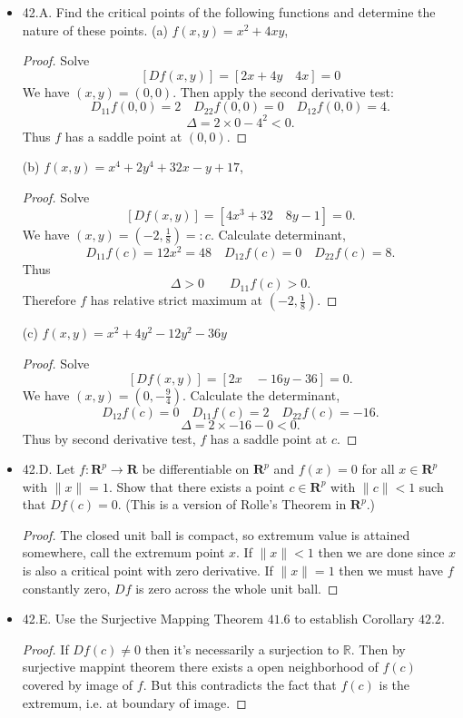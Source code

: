 \begin{itemize}
\item 42.A. Find the critical points of the following functions and determine the nature of these points.
(a) $f(x, y)=x^2+4 x y$,
\begin{proof}
	Solve
	 \[
		 [Df(x,y)] = [2x+4y \quad 4x] = 0
\]
We have $(x,y) = (0,0)$. Then apply the second derivative test:
\[
	D_{11}f(0,0) = 2 \quad D_{22}f(0,0) = 0 \quad D_{12} f(0,0) = 4
.\] 
\[
	\Delta = 2 \times 0 - 4^2 < 0
.\] 
Thus $f$ has a saddle point at $(0,0)$.
\end{proof}

(b) $f(x, y)=x^4+2 y^4+32 x-y+17$,
\begin{proof}
	Solve
	\[
		[Df(x,y)] = [4x^3 + 32 \quad 8y-1] = 0
	.\] 
	We have $(x,y) = (-2, \frac{1}{8}) =:c$. Calculate determinant,
	\[
		D_{11} f(c) = 12x^2 = 48 \quad D_{12}f(c) = 0 \quad D_{22}f(c) = 8
	.\] 
	Thus
	\[
		\Delta > 0 \qquad D_{11}f(c) > 0
	.\] 
	Therefore $f$ has relative strict maximum at $(-2, \frac{1}{8})$.
\end{proof}

(c) $f(x, y)=x^2+4 y^2-12 y^2-36 y$
\begin{proof}
	Solve
	\[
		[Df(x,y)] = [2x \quad -16y - 36] = 0
	.\] 
	We have $(x,y) = (0,- \frac{9}{4})$. Calculate the determinant,
	\[
		D_{12} f(c) = 0 \quad D_{11} f(c) = 2 \quad D_{22} f(c) = -16
	.\] 
	\[
		\Delta  = 2 \times  -16 - 0 < 0
	.\] 
	Thus by second derivative test, $f$ has a saddle point at $c$.
\end{proof}


\item 42.D. Let $f: \boldsymbol{R}^p \rightarrow \boldsymbol{R}$ be differentiable on $\boldsymbol{R}^p$ and $f(x)=0$ for all $x \in \boldsymbol{R}^p$ with $\|x\|=1$. Show that there exists a point $c \in \boldsymbol{R}^p$ with $\|c\|<1$ such that $D f(c)=0$. (This is a version of Rolle's Theorem in $\boldsymbol{R}^p$.)
\begin{proof}
	The closed unit ball is compact, so extremum value is attained somewhere, call the extremum point $x$. If $\|x\|<1$ then we are done since $x$ is also a critical point with zero derivative. If $\|x\| = 1$ then we must have $f$ constantly zero, $Df$ is zero across the whole unit ball.
\end{proof}

\item 42.E. Use the Surjective Mapping Theorem $41.6$ to establish Corollary $42.2$.
\begin{proof}
	If $Df(c) \neq 0$ then it's necessarily a surjection to $\mathbb{R}$. Then by surjective mappint theorem there exists a open neighborhood of $f(c)$ covered by image of $f$. But this contradicts the fact that $f(c)$ is the extremum, i.e. at boundary of image.
\end{proof}

\end{itemize}

